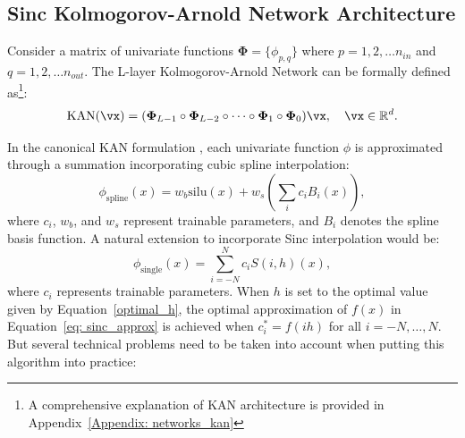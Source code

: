 \subsection{Sinc Kolmogorov-Arnold Network Architecture}\label{Section: sinckan}
Consider a matrix of univariate functions $\mathbf{\Phi}=\{\phi_{p,q}\}$ where $p= 1, 2, \dots n_{in}$ and $q= 1, 2, \dots n_{out}$. The L-layer Kolmogorov-Arnold Network can be formally defined as\footnote{A comprehensive explanation of KAN architecture is provided in Appendix~\ref{Appendix: networks_kan}}:
\begin{equation}
    \mathrm{KAN} (\vx) = (\mathbf{\Phi}_{L-1} \circ \mathbf{\Phi}_{L-2} \circ \cdots \circ \mathbf{\Phi}_1 \circ \mathbf{\Phi}_0) \vx, \quad \vx\in \mathbb{R}^d.
\end{equation}

In the canonical KAN formulation \citep{liu2024kan}, each univariate function $\phi$ is approximated through a summation incorporating cubic spline interpolation:
\begin{equation}
    \phi_{\mathrm{spline}}(x)=w_b \mathrm{silu}(x)+w_s \left(\sum_i c_i B_i(x)\right),
\end{equation}
where $c_i$, $w_b$, and $w_s$ represent trainable parameters, and $B_i$ denotes the spline basis function. A natural extension to incorporate Sinc interpolation would be:
\begin{equation}\label{eq: old_sinckan}
    \phi_{\mathrm{single}}(x) = \sum_{i=-N}^N c_{i} S(i, h)(x),
\end{equation}
where $c_i$ represents trainable parameters. When $h$ is set to the optimal value given by Equation~\ref{optimal_h}, the optimal approximation of $f(x)$ in Equation~\ref{eq: sinc_approx} is achieved when $c_i^*=f(ih)$ for all $i=-N,\dots,N$. But several technical problems need to be taken into account when putting this algorithm into practice:

